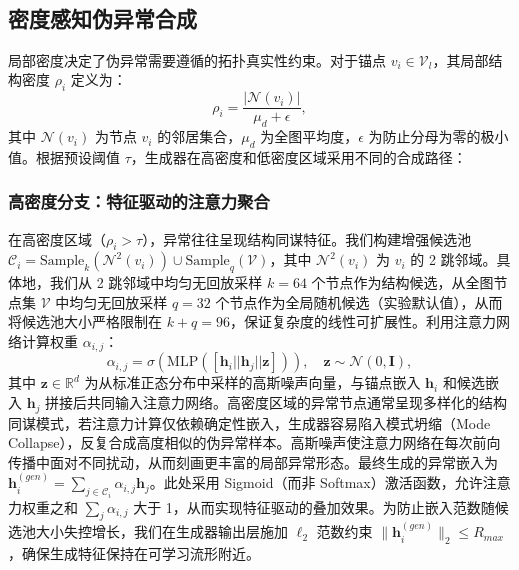 ﻿﻿﻿﻿    \documentclass[conference, onecolumn]{IEEEtran}
\begin{document}
    \subsection{密度感知伪异常合成}
    局部密度决定了伪异常需要遵循的拓扑真实性约束。对于锚点 $v_i \in \mathcal{V}_l$，其局部结构密度 $\rho_i$ 定义为：
    \begin{equation}
    \rho_i = \frac{|\mathcal{N}(v_i)|}{\mu_d + \epsilon},
    \end{equation}
    其中 $\mathcal{N}(v_i)$ 为节点 $v_i$ 的邻居集合，$\mu_d$ 为全图平均度，$\epsilon$ 为防止分母为零的极小值。根据预设阈值 $\tau$，生成器在高密度和低密度区域采用不同的合成路径：

    \subsubsection{高密度分支：特征驱动的注意力聚合}
    在高密度区域（$\rho_i > \tau$），异常往往呈现结构同谋特征。我们构建增强候选池 $\mathcal{C}_i = \text{Sample}_k(\mathcal{N}^2(v_i)) \cup \text{Sample}_q(\mathcal{V})$，其中 $\mathcal{N}^2(v_i)$ 为 $v_i$ 的 2 跳邻域。具体地，我们从 2 跳邻域中均匀无回放采样 $k=64$ 个节点作为结构候选，从全图节点集 $\mathcal{V}$ 中均匀无回放采样 $q=32$ 个节点作为全局随机候选（实验默认值），从而将候选池大小严格限制在 $k+q=96$，保证复杂度的线性可扩展性。利用注意力网络计算权重 $\alpha_{i,j}$：
    \begin{equation}
    \alpha_{i,j} = \sigma(\text{MLP}([\mathbf{h}_i || \mathbf{h}_j || \mathbf{z}])), \quad \mathbf{z} \sim \mathcal{N}(0, \mathbf{I}),
    \end{equation}
    其中 $\mathbf{z} \in \mathbb{R}^{d}$ 为从标准正态分布中采样的高斯噪声向量，与锚点嵌入 $\mathbf{h}_i$ 和候选嵌入 $\mathbf{h}_j$ 拼接后共同输入注意力网络。高密度区域的异常节点通常呈现多样化的结构同谋模式，若注意力计算仅依赖确定性嵌入，生成器容易陷入模式坍缩（Mode Collapse），反复合成高度相似的伪异常样本。高斯噪声使注意力网络在每次前向传播中面对不同扰动，从而刻画更丰富的局部异常形态。最终生成的异常嵌入为 $\mathbf{h}^{(gen)}_i = \sum_{j \in \mathcal{C}_i} \alpha_{i,j} \mathbf{h}_j$。此处采用 Sigmoid（而非 Softmax）激活函数，允许注意力权重之和 $\sum_j \alpha_{i,j}$ 大于 1，从而实现特征驱动的叠加效果。为防止嵌入范数随候选池大小失控增长，我们在生成器输出层施加 $\ell_2$ 范数约束 $\|\mathbf{h}^{(gen)}_i\|_2 \le R_{max}$，确保生成特征保持在可学习流形附近。
\end{document}
